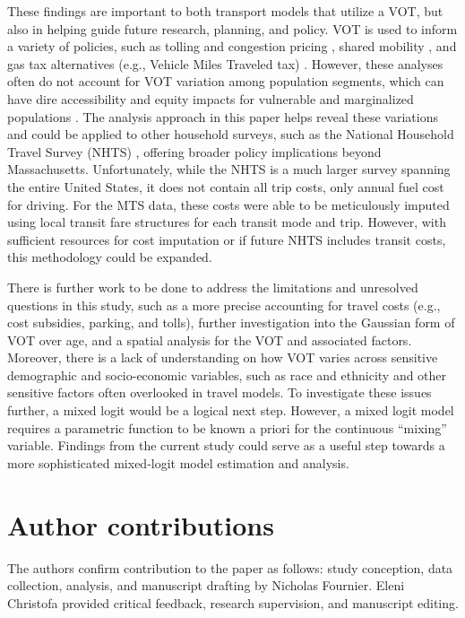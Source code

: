 \documentclass[numbered]{trbunofficial}\usepackage[]{graphicx}\usepackage[]{color}
\begin{document}
These findings are important to both transport models that utilize a VOT, but also in helping guide future research, planning, and policy. VOT is used to inform a variety of policies, such as tolling and congestion pricing \citep{Santos2006, Kockelman2005}, shared mobility \citep{Jiao2020}, and gas tax alternatives (e.g., Vehicle Miles Traveled tax) \citep{StarrMcMullen2010}. However, these analyses often do not account for VOT variation among population segments, which can have dire accessibility and equity impacts for vulnerable and marginalized populations \citep{Probst2007,Hossinger2020,Larsen2012}. The analysis approach in this paper helps reveal these variations and could be applied to other household surveys, such as the National Household Travel Survey (NHTS) \citep{NHTS2017}, offering broader policy implications beyond Massachusetts. Unfortunately, while the NHTS is a much larger survey spanning the entire United States, it does not contain all trip costs, only annual fuel cost for driving. For the MTS data, these costs were able to be meticulously imputed using local transit fare structures for each transit mode and trip. However, with sufficient resources for cost imputation or if future NHTS includes transit costs, this methodology could be expanded. 

There is further work to be done to address the limitations and unresolved questions in this study, such as a more precise accounting for travel costs (e.g., cost subsidies, parking, and tolls), further investigation into the Gaussian form of VOT over age, and a spatial analysis for the VOT and associated factors. Moreover, there is a lack of understanding on how VOT varies across sensitive demographic and socio-economic variables, such as race and ethnicity and other sensitive factors often overlooked in travel models. To investigate these issues further, a mixed logit would be a logical next step. However, a mixed logit model requires a parametric function to be known a priori for the continuous ``mixing'' variable. Findings from the current study could serve as a useful step towards a more sophisticated mixed-logit model estimation and analysis.


\section{Author contributions}
The authors confirm contribution to the paper as follows: study conception, data collection, analysis, and manuscript drafting by Nicholas Fournier. Eleni Christofa provided critical feedback, research supervision, and manuscript editing.
\end{document}
